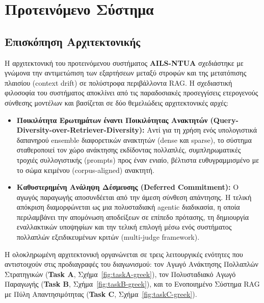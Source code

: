 \section{Προτεινόμενο Σύστημα}

\subsection{Επισκόπηση Αρχιτεκτονικής}

Η αρχιτεκτονική του προτεινόμενου συστήματος \textbf{AILS-NTUA} σχεδιάστηκε με γνώμονα την αντιμετώπιση των εξαρτήσεων μεταξύ στροφών και της μετατόπισης πλαισίου (context drift) σε πολύστροφα περιβάλλοντα RAG. Η σχεδιαστική φιλοσοφία του συστήματος αποκλίνει από τις παραδοσιακές προσεγγίσεις ετερογενούς σύνθεσης μοντέλων και βασίζεται σε δύο θεμελιώδεις αρχιτεκτονικές αρχές:
\begin{itemize}
    \item \textbf{Ποικιλότητα Ερωτημάτων έναντι Ποικιλότητας Ανακτητών (Query-Diversity-over-Retriever-Diversity):} Αντί για τη χρήση ενός υπολογιστικά δαπανηρού ensemble διαφορετικών ανακτητών (dense και sparse), το σύστημα σταθεροποιεί τον χώρο ανάκτησης εκδίδοντας πολλαπλές, συμπληρωματικές τροχιές συλλογιστικής (prompts) προς έναν ενιαίο, βέλτιστα ευθυγραμμισμένο με το σώμα κειμένου (corpus-aligned) ανακτητή.
    \item \textbf{Καθυστερημένη Ανάληψη Δέσμευσης (Deferred Commitment):} Ο αγωγός παραγωγής αποσυνδέεται από την άμεση σύνθεση απάντησης. Η τελική απόκριση διαμορφώνεται ως μια πολυσταδιακή agentic διαδικασία, η οποία περιλαμβάνει την απομόνωση αποδείξεων σε επίπεδο πρότασης, τη δημιουργία εναλλακτικών υποψηφίων και την τελική επιλογή μέσω ενός συστήματος πολλαπλών εξειδικευμένων κριτών (multi-judge framework).
\end{itemize}

Η ολοκληρωμένη αρχιτεκτονική οργανώνεται σε τρεις λειτουργικές ενότητες που αντιστοιχούν στις προδιαγραφές του διαγωνισμού: τον Αγωγό Ανάκτησης Πολλαπλών Στρατηγικών (\textbf{Task A}, Σχήμα~\ref{fig:taskA-greek}), τον Πολυσταδιακό Αγωγό Παραγωγής (\textbf{Task B}, Σχήμα~\ref{fig:taskB-greek}), και το Ενοποιημένο Σύστημα RAG με Πύλη Απαντησιμότητας (\textbf{Task C}, Σχήμα~\ref{fig:taskC-greek}).

